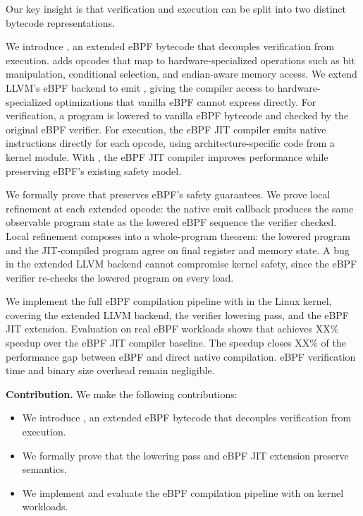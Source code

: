 Our key insight is that verification and execution can be split into two distinct bytecode representations. 

We introduce \lang, an extended eBPF bytecode that decouples verification from execution. \lang adds opcodes that map to hardware-specialized operations such as bit manipulation, conditional selection, and endian-aware memory access. We extend LLVM's eBPF backend to emit \lang, giving the compiler access to hardware-specialized optimizations that vanilla eBPF cannot express directly. For verification, a \lang program is lowered to vanilla eBPF bytecode and checked by the original eBPF verifier. For execution, the eBPF JIT compiler emits native instructions directly for each \lang opcode, using architecture-specific code from a kernel module. With \lang, the eBPF JIT compiler improves performance while preserving eBPF's existing safety model.

We formally prove that \lang preserves eBPF's safety guarantees. We prove local refinement at each extended opcode: the native emit callback produces the same observable program state as the lowered eBPF sequence the verifier checked. Local refinement composes into a whole-program theorem: the lowered program and the JIT-compiled program agree on final register and memory state. A bug in the extended LLVM backend cannot compromise kernel safety, since the eBPF verifier re-checks the lowered program on every load.
 
We implement the full eBPF compilation pipeline with \lang in the Linux kernel, covering the extended LLVM backend, the verifier lowering pass, and the eBPF JIT extension. Evaluation on real eBPF workloads shows that \lang achieves XX\% speedup over the eBPF JIT compiler baseline. The speedup closes XX\% of the performance gap between eBPF and direct native compilation. eBPF verification time and binary size overhead remain negligible.

\noindent\textbf{Contribution.}
We make the following contributions:
\begin{itemize}
    \item We introduce \lang, an extended eBPF bytecode that decouples verification from execution.
    \item We formally prove that the \lang lowering pass and eBPF JIT extension preserve semantics.
    \item We implement and evaluate the eBPF compilation pipeline with \lang on kernel workloads.
\end{itemize}
